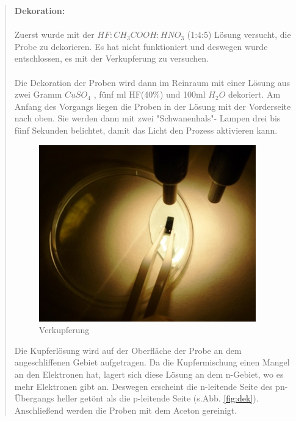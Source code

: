 \begin{quote}
    		\vspace{2em}

    		\textbf{Dekoration:}\\
			\\
			Zuerst wurde mit der $HF:CH_{3}COOH:HNO_{3}$ (1:4:5) Lösung versucht, die
			Probe zu dekorieren. Es hat nicht funktioniert und deswegen wurde
			entschlossen, es mit der Verkupferung zu versuchen.\\
			\\
			Die Dekoration der Proben wird dann im Reinraum mit einer Lösung aus
			zwei Gramm $CuSO_{4}$ , fünf ml HF(40\%) und 100ml $H_{2}O$ dekoriert. Am
			Anfang des Vorgangs liegen die Proben in der Lösung mit der
			Vorderseite nach oben. Sie werden dann mit zwei "Schwanenhals"-
			Lampen drei bis fünf Sekunden belichtet, damit das Licht den Prozess
			aktivieren kann.

    		\vspace{2em}

    		\begin{figure}[H]
				\hspace{3 cm}
                  \includegraphics[scale=1, trim = 0cm 0cm 0cm 0cm,clip]
                	{./HerstellungBilder/Verkupferung.png}
                  \caption{Verkupferung}
                \label{fig:verk}
            \end{figure}

    		\vspace{2em}

    		Die Kupferlösung wird auf der Oberfläche der Probe an dem
    		angeschliffenen Gebiet aufgetragen. Da die Kupfermischung einen
    		Mangel an den Elektronen hat, lagert sich diese Lösung an dem
    		n-Gebiet, wo es mehr Elektronen gibt an. Deswegen erscheint die
    		n-leitende Seite des pn-Übergangs heller getönt als die p-leitende
    		Seite (s.Abb. \ref{fig:dek}). Anschließend werden die Proben mit dem Aceton
    		gereinigt.


\end{quote}

